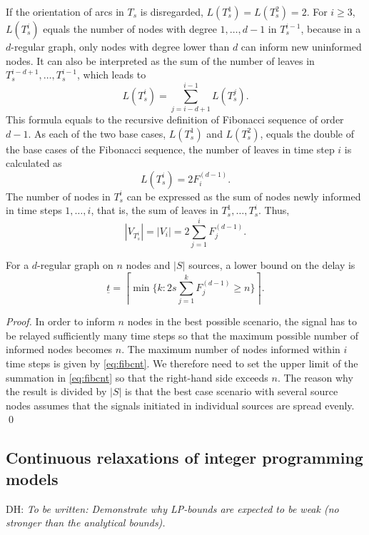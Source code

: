 If the orientation of arcs in $T_s$ is disregarded, $L(T^1_s)=L(T^2_s)=2$.
For $i\geq 3$, $L(T^i_s)$ equals the number of nodes with degree $1,\dots,d-1$ in $T^{i-1}_s$, 
because in a $d$-regular graph, only nodes with degree lower than $d$ can inform new uninformed nodes.
It can also be interpreted as the sum of the number of leaves in $T^{i-d+1}_s,\dots,T^{i-1}_s$, which leads to %
\begin{equation*}
\label{eq:leafrec}
L(T^i_s)=\sum\limits_{j=i-d+1}^{i-1} L(T^j_s).
\end{equation*}  
This formula equals to the recursive definition of Fibonacci sequence of order $d-1$.
As each of the two base cases, $L(T^1_s)$ and $L(T^2_s)$, equals the double of the base cases of the Fibonacci sequence, the number of leaves in time step $i$ is calculated as
\begin{equation*}
\label{eq:fibleaf}
L(T^i_s)=2 F^{(d-1)}_i.
\end{equation*}  
The number of nodes in $T^i_s$ can be expressed as the sum of nodes newly informed in time steps $1,\dots,i$, that is, the sum of leaves in $T^1_s,\dots,T^i_s$. Thus,
\begin{equation}
\label{eq:fibcnt}
|V_{T^i_s}|=|V_i|=2\sum\limits_{j=1}^i F^{(d-1)}_j.
\end{equation}

\begin{proposition}
For a $d$-regular graph on $n$ nodes and $|S|$ sources, a lower bound on the delay is 
\begin{equation*}
\label{lem:lbreg1}
\underline{t}=\left\lceil\min\{k:2s\sum\limits_{j=1}^k F^{(d-1)}_j\geq n\}\right\rceil.
\end{equation*}
\label{prop:lbfib}
\end{proposition}
\begin{proof}
In order to inform $n$ nodes in the best possible scenario, the signal has to be relayed sufficiently many time steps so that the maximum possible number of informed nodes becomes $n$.
The maximum number of nodes informed within $i$ time steps is given by \eqref{eq:fibcnt}.
We therefore need to set the upper limit of the summation in \eqref{eq:fibcnt} so that the right-hand side exceeds $n$.
The reason why the result is divided by $|S|$ is that the best case scenario with several source nodes assumes that the signals initiated in individual sources are spread evenly.
\qed
\end{proof}

\subsection{Continuous relaxations of integer programming models} \label{sec:lblprel}
DH: \emph{To be written: Demonstrate why LP-bounds are expected to be weak (no stronger than the analytical bounds).}

